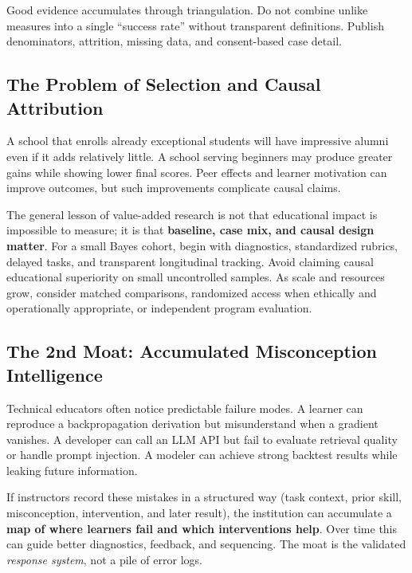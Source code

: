 Good evidence accumulates through triangulation. Do not combine unlike measures into a single ``success rate'' without transparent definitions. Publish denominators, attrition, missing data, and consent-based case detail.

\subsection{The Problem of Selection and Causal Attribution}
\label{sec:selection_and_causal_attribution}

A school that enrolls already exceptional students will have impressive alumni even if it adds relatively little. A school serving beginners may produce greater gains while showing lower final scores. Peer effects and learner motivation can improve outcomes, but such improvements complicate causal claims.

The general lesson of value-added research is not that educational impact is impossible to measure; it is that \textbf{baseline, case mix, and causal design matter}. For a small Bayes cohort, begin with diagnostics, standardized rubrics, delayed tasks, and transparent longitudinal tracking. Avoid claiming causal educational superiority on small uncontrolled samples. As scale and resources grow, consider matched comparisons, randomized access when ethically and operationally appropriate, or independent program evaluation.

\subsection{The 2nd Moat: Accumulated Misconception Intelligence}
\label{sec:second_moat_misconception_intelligence}

Technical educators often notice predictable failure modes. A learner can reproduce a backpropagation derivation but misunderstand when a gradient vanishes. A developer can call an LLM API but fail to evaluate retrieval quality or handle prompt injection. A modeler can achieve strong backtest results while leaking future information.

If instructors record these mistakes in a structured way (task context, prior skill, misconception, intervention, and later result), the institution can accumulate a \textbf{map of where learners fail and which interventions help}. Over time this can guide better diagnostics, feedback, and sequencing. The moat is the validated \textit{response system}, not a pile of error logs.

